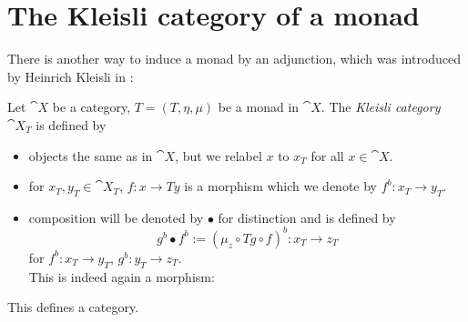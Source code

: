\section{The Kleisli category of a monad}
There is another way to induce a monad by an adjunction, which was introduced by Heinrich Kleisli in \cite{kleisli}:
\begin{definition}
    Let $\cat{X}$ be a category, $T = (T,\eta, \mu)$ be a monad in $\cat{X}$.
    The \textit{Kleisli category $\cat{X}_T$} is defined by
    \begin{itemize}
        \item objects the same as in $\cat{X}$, but we relabel $x$ to $x_T$ for all $x \in \cat{X}$.
        \item for $x_T, y_T \in \cat{X}_T$, $f\colon x \to Ty$ is a morphism which we
        denote by $f^b \colon x_T \to y_T$.
        \item composition will be denoted by $\bullet$ for distinction and is defined by
        \[
            g^b \bullet f^b := (\mu_z \circ Tg \circ f)^b \colon x_T \to z_T
        \]
        for $f^b \colon x_T \to y_T$, $g^b \colon y_T \to z_T$. \\
        This is indeed again a morphism:
    \end{itemize}
\end{definition}
\begin{claim*}
    This defines a category.
\end{claim*}
